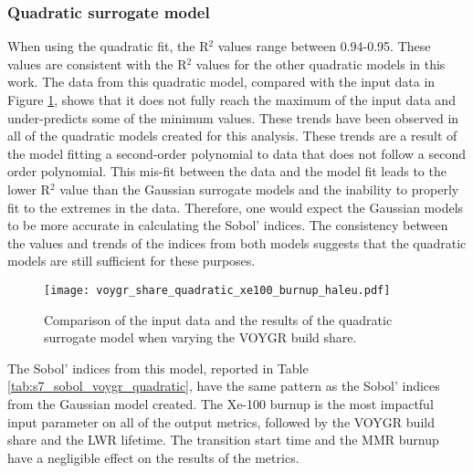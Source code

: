 \subsubsection{Quadratic surrogate model}
When using the quadratic fit, the R$^2$ values range between 0.94-0.95. 
These values are consistent with the R$^2$ values for the other 
quadratic models in this work. The data from this quadratic model,
compared with the input data in Figure \ref{fig:s7_voygr_quadratic}, 
shows that it does not fully reach the maximum of the input data
and under-predicts some of the minimum values. These trends have 
been observed in all of the quadratic models created for this analysis. 
These trends are a result of the model fitting a second-order 
polynomial to data that does not follow a second order polynomial. This 
mis-fit between the data and the model fit leads to the lower R$^2$ value 
than the Gaussian surrogate models and the inability to properly fit 
to the extremes in the data. Therefore, one would expect the 
Gaussian models to be more accurate in calculating the Sobol' 
indices. The consistency between the values and trends of the 
indices from both models suggests that the quadratic models are 
still sufficient for these purposes. 

\begin{figure}[h!]
    \centering 
    \texttt{[image: voygr\_share\_quadratic\_xe100\_burnup\_haleu.pdf]}
    \caption{Comparison of the input data and the results of the quadratic 
    surrogate model when varying the VOYGR build share.}
    \label{fig:s7_voygr_quadratic}
\end{figure}

The Sobol' indices from this model, reported in Table 
\ref{tab:s7_sobol_voygr_quadratic},
have the same pattern as the Sobol' indices from the Gaussian model created. 
The Xe-100 burnup is the most impactful input parameter on all of the 
output metrics, followed by the VOYGR build share and the \gls{LWR} lifetime. 
The transition start time and the \gls{MMR} burnup have a negligible effect 
on the results of the metrics. 

